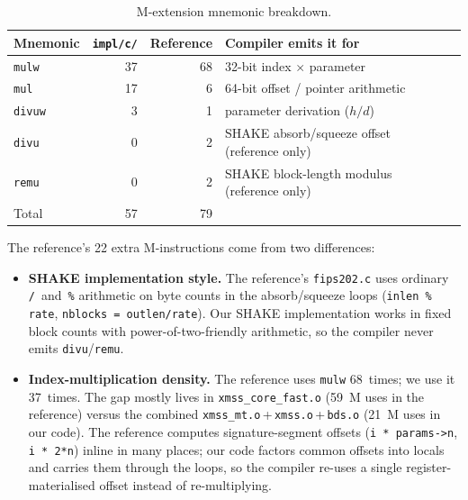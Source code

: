 \documentclass[11pt,a4paper]{article}
\begin{document}
\begin{table}[ht]
\centering
\caption{M-extension mnemonic breakdown.}
\label{tab:m-cmp}
\begin{tabular}{@{}lrrll@{}}
\toprule
Mnemonic        & \texttt{impl/c/} & Reference & Compiler emits it for                              \\
\midrule
\texttt{mulw}   & 37               & 68        & 32-bit index $\times$ parameter \\
\texttt{mul}    & 17               & 6         & 64-bit offset / pointer arithmetic \\
\texttt{divuw}  &  3               & 1         & parameter derivation ($h/d$) \\
\texttt{divu}   &  0               & 2         & SHAKE absorb/squeeze offset (reference only) \\
\texttt{remu}   &  0               & 2         & SHAKE block-length modulus (reference only) \\
\midrule
Total           & 57               & 79        & \\
\bottomrule
\end{tabular}
\end{table}

The reference's 22 extra M-instructions come from two differences:

\begin{itemize}[nosep]
  \item \textbf{SHAKE implementation style.}  The reference's
    \texttt{fips202.c} uses ordinary \texttt{/}~and~\texttt{\%}
    arithmetic on byte counts in the absorb/squeeze loops
    (\texttt{inlen \% rate}, \texttt{nblocks = outlen/rate}).  Our
    SHAKE implementation works in fixed block counts with
    power-of-two-friendly arithmetic, so the compiler never emits
    \texttt{divu}/\texttt{remu}.
  \item \textbf{Index-multiplication density.}  The reference uses
    \texttt{mulw} 68~times; we use it 37~times.  The gap mostly
    lives in \texttt{xmss\_core\_fast.o} (59~M uses in the reference)
    versus the combined \texttt{xmss\_mt.o}\,+\,\texttt{xmss.o}\,+\,\texttt{bds.o}
    (21~M uses in our code).  The reference computes signature-segment
    offsets (\texttt{i * params->n}, \texttt{i * 2*n}) inline in many
    places; our code factors common offsets into locals and carries
    them through the loops, so the compiler re-uses a single
    register-materialised offset instead of re-multiplying.
\end{itemize}
\end{document}
